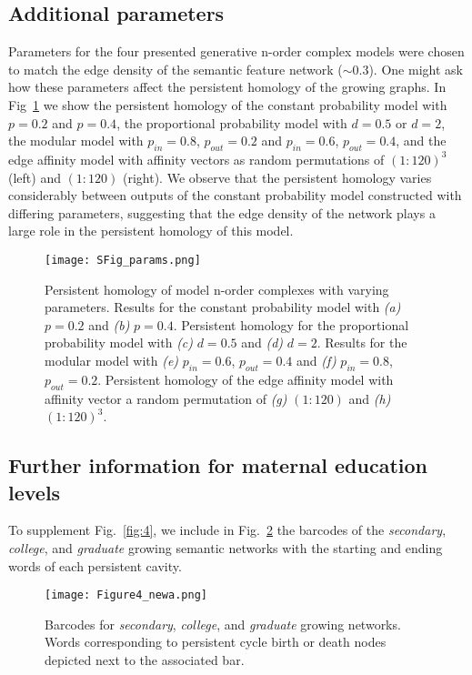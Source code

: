 \documentclass{article}
\begin{document}
\subsection*{Additional parameters}

Parameters for the four presented generative n-order complex models were chosen to match the edge density of the semantic feature network ($\sim 0.3$). One might ask how these parameters affect the persistent homology of the growing graphs. In Fig~\ref{fig:sfig_er} we show the persistent homology of the constant probability model with $p = 0.2$ and $p = 0.4$, the proportional probability model with $d = 0.5$ or $d =2$, the modular model with $p_{in} = 0.8$, $p_{out} = 0.2$ and $p_{in} = 0.6$, $p_{out} = 0.4$, and the edge affinity model with affinity vectors as random permutations of $(1:120)^3$ (left) and $(1:120)$ (right). We observe that the persistent homology varies considerably between outputs of the constant probability model constructed with differing parameters, suggesting that the edge density of the network plays a large role in the persistent homology of this model.

\begin{figure}
	\centering
	\texttt{[image: SFig\_params.png]}
	\caption{Persistent homology of model n-order complexes with varying parameters. Results for the constant probability model with \emph{(a)} $p=0.2$ and \emph{(b)} $p=0.4$. Persistent homology for the proportional probability model with \emph{(c)} $d = 0.5$ and \emph{(d)} $d = 2$. Results for the modular model with \emph{(e)} $p_{in} = 0.6$, $p_{out} = 0.4$ and \emph{(f)} $p_{in} = 0.8$, $p_{out} = 0.2$. Persistent homology of the edge affinity model with affinity vector a random permutation of \emph{(g)} $(1:120)$ and \emph{(h)} $(1:120)^3$.}
	\label{fig:sfig_er}
\end{figure}





\subsection*{Further information for maternal education levels}

To supplement Fig.~\ref{fig:4}, we include in Fig.~\ref{fig:sfig_education1} the barcodes of the \textit{secondary}, \textit{college}, and \textit{graduate}
 growing semantic networks with the starting and ending words of each persistent cavity.

\begin{figure}[h]
	\centering
	\texttt{[image: Figure4\_newa.png]}
	\caption{Barcodes for \textit{secondary}, \textit{college}, and \textit{graduate} growing networks. Words corresponding to persistent cycle birth or death nodes depicted next to the associated bar.}
	\label{fig:sfig_education1}	
\end{figure}
\end{document}
